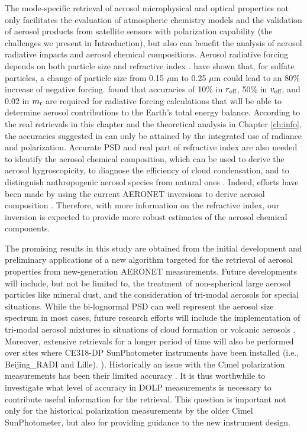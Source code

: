 The mode-specific retrieval of aerosol microphysical and optical
properties not only facilitates the evaluation of atmospheric chemistry
models and the validation of aerosol products from satellite sensors
with polarization capability (the challenges we present in
Introduction), but also can benefit the analysis of aerosol radiative
impacts and aerosol chemical compositions. Aerosol radiative forcing
depends on both particle size and refractive index \citep{Nemesure95,
Mishchenko04}. \citet{Nemesure95} have shown that, for sulfate particles, 
a change of particle size from 0.15 $\mu$m to 0.25 $\mu$m
could lead to an 80\% increase of negative forcing. \citet{Mishchenko04}
found that accuracies of 10\% in $r_\text{eff}$, 50\% in $v_\text{eff}$, 
and 0.02 in $m_\text{r}$ are required for radiative forcing calculations 
that will be able to determine aerosol contributions to the Earth's 
total energy balance. According to the real retrievals in this chapter 
and the theoretical analysis in Chapter \ref{ch:info}, the
accuracies suggested in \citet{Mishchenko04} can only be attained by
the integrated use of radiance and polarization. Accurate PSD and real
part of refractive index are also needed to identify the aerosol
chemical composition, which can be used to derive the aerosol
hygroscopicity, to diagnose the efficiency of cloud condensation, and to
distinguish anthropogenic aerosol species from natural ones
\citep{Wang08}. Indeed, efforts have been made by using the current AERONET
inversions to derive aerosol composition \citep{Schuster05, Arola11, Li13}.
Therefore, with more information on the refractive index, our inversion is 
expected to provide more robust estimates of the aerosol chemical components.

The promising results in this study are obtained from the initial development
and preliminary applications of a new algorithm targeted for the retrieval of
aerosol properties from new-generation AERONET measurements. Future
developments will include, but not be limited to, the treatment of
non-spherical large aerosol particles like mineral dust, and the consideration
of tri-modal aerosols for special situations. While the bi-lognormal PSD can
well represent the aerosol size spectrum in most cases, future research efforts 
will include the implementation of tri-modal aerosol mixtures in situations of
cloud formation \citep{Eck12} or volcanic aerosols \citep{Eck10}.
Moreover, extensive retrievals for a longer period of time will also be
performed over sites where CE318-DP SunPhotometer instruments have been
installed (i.e., Beijing\_RADI and Lille). ). Historically an issue with
the Cimel polarization measurements has been their limited accuracy
\citep{Li10}. It is thus worthwhile to investigate what level of
accuracy in DOLP measurements is necessary to contribute useful
information for the retrieval. This question is important not only for
the historical polarization measurements by the older Cimel
SunPhotometer, but also for providing guidance to the new instrument
design.  

